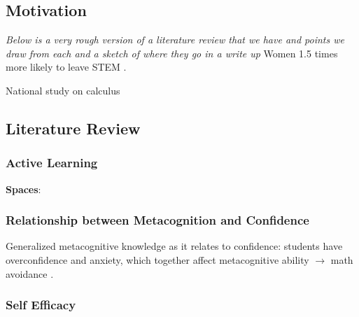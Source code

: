 \documentclass{LSRIarticle}
\begin{document}

\subsection{Motivation}
\textit{Below is a very rough version of a literature review that we have and points we draw from each and a sketch of where they go in a write up}
Women 1.5 times more likely to leave STEM \parencite{ellisWomenTimesMore2016}.

National study on calculus \parencite{bressoudInsightsRecommendationsMAA}

\subsection{Literature Review}

\subsubsection{Active Learning}
\textbf{Spaces}: \parencite{parkTransformationClassroomSpaces2014}


\subsubsection{Relationship between Metacognition and Confidence}
Generalized metacognitive knowledge as it relates to confidence: students have overconfidence and anxiety, which together affect metacognitive ability $\rightarrow$ math avoidance \parencite{ericksonMetacognitionConfidenceComparing2015}.


\subsubsection{Self Efficacy}





\end{document}
